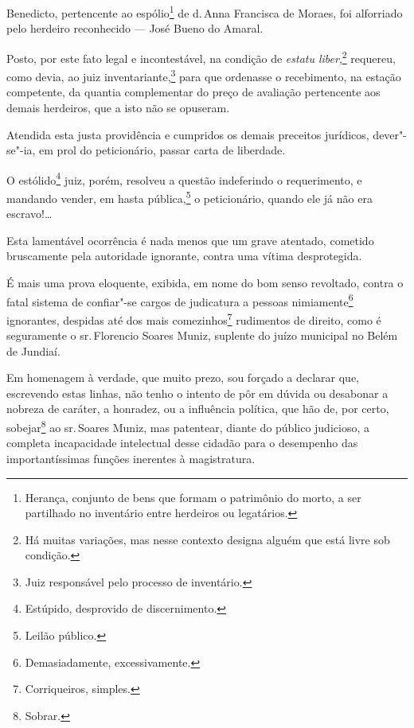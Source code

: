 
Benedicto, pertencente ao espólio\footnote{Herança, conjunto de bens
  que formam o patrimônio do morto, a ser partilhado no inventário entre
  herdeiros ou legatários.} de d.\,Anna Francisca de Moraes, foi
alforriado pelo herdeiro reconhecido --- José Bueno do Amaral.

Posto, por este fato legal e incontestável, na condição de \emph{estatu
liber},\footnote{Há muitas variações, mas nesse contexto designa alguém
  que está livre sob condição.} requereu, como devia, ao juiz
inventariante,\footnote{Juiz responsável pelo processo de inventário.}
para que ordenasse o recebimento, na estação competente, da quantia
complementar do preço de avaliação pertencente aos demais herdeiros, que
a isto não se opuseram.

Atendida esta justa providência e cumpridos os demais preceitos
jurídicos, dever"-se"-ia, em prol do peticionário, passar carta de
liberdade.

O estólido\footnote{Estúpido, desprovido de discernimento.} juiz,
porém, resolveu a questão indeferindo o requerimento, e mandando vender,
em hasta pública,\footnote{Leilão público.} o peticionário, quando ele
já não era escravo!\ldots{}

Esta lamentável ocorrência é nada menos que um grave atentado, cometido
bruscamente pela autoridade ignorante, contra uma vítima desprotegida.

É mais uma prova eloquente, exibida, em nome do bom senso revoltado,
contra o fatal sistema de confiar"-se cargos de judicatura a pessoas
nimiamente\footnote{Demasiadamente, excessivamente.} ignorantes,
despidas até dos mais comezinhos\footnote{Corriqueiros, simples.}
rudimentos de direito, como é seguramente o sr.\,Florencio Soares Muniz,
suplente do juízo municipal no Belém de Jundiaí.

Em homenagem à verdade, que muito prezo, sou forçado a declarar que,
escrevendo estas linhas, não tenho o intento de pôr em dúvida ou
desabonar a nobreza de caráter, a honradez, ou a influência política,
que hão de, por certo, sobejar\footnote{Sobrar.} ao sr.\,Soares Muniz,
mas patentear, diante do público judicioso, a completa incapacidade
intelectual desse cidadão para o desempenho das importantíssimas funções
inerentes à magistratura.

